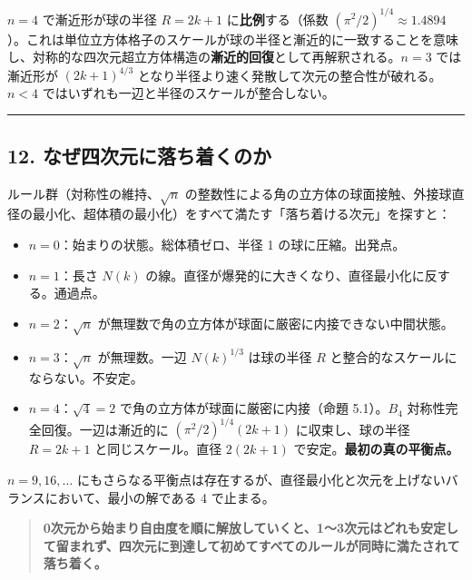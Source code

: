 \documentclass[a4paper,11pt]{ltjsarticle}
\theoremstyle{definition}
\providecommand{\tightlist}{\setlength{\itemsep}{0pt}\setlength{\parskip}{0pt}}
\begin{document}
\(n = 4\) で漸近形が球の半径 \(R = 2k+1\) に\textbf{比例}する（係数
\((\pi^2/2)^{1/4} \approx 1.4894\)）。これは単位立方体格子のスケールが球の半径と漸近的に一致することを意味し、対称的な四次元超立方体構造の\textbf{漸近的回復}として再解釈される。\(n = 3\)
では漸近形が \((2k+1)^{4/3}\)
となり半径より速く発散して次元の整合性が破れる。\(n < 4\)
ではいずれも一辺と半径のスケールが整合しない。

\begin{center}\rule{0.5\linewidth}{0.5pt}\end{center}

\subsection{12.
なぜ四次元に落ち着くのか}\label{ux306aux305cux56dbux6b21ux5143ux306bux843dux3061ux7740ux304fux306eux304b}

ルール群（対称性の維持、\(\sqrt{n}\)
の整数性による角の立方体の球面接触、外接球直径の最小化、超体積の最小化）をすべて満たす「落ち着ける次元」を探すと：

\begin{itemize}
\tightlist
\item
  \textbf{\(n = 0\)}：始まりの状態。総体積ゼロ、半径 1
  の球に圧縮。出発点。
\item
  \textbf{\(n = 1\)}：長さ \(N(k)\)
  の線。直径が爆発的に大きくなり、直径最小化に反する。通過点。
\item
  \textbf{\(n = 2\)}：\(\sqrt{n}\)
  が無理数で角の立方体が球面に厳密に内接できない中間状態。
\item
  \textbf{\(n = 3\)}：\(\sqrt{n}\) が無理数。一辺 \(N(k)^{1/3}\)
  は球の半径 \(R\) と整合的なスケールにならない。不安定。
\item
  \textbf{\(n = 4\)}：\(\sqrt{4} = 2\)
  で角の立方体が球面に厳密に内接（命題 5.1）。\(B_4\)
  対称性完全回復。一辺は漸近的に \((\pi^2/2)^{1/4}(2k+1)\)
  に収束し、球の半径 \(R = 2k+1\) と同じスケール。直径 \(2(2k+1)\)
  で安定。\textbf{最初の真の平衡点。}
\end{itemize}

\(n = 9, 16, \ldots\)
にもさらなる平衡点は存在するが、直径最小化と次元を上げないバランスにおいて、最小の解である
4 で止まる。

\begin{quote}
\textbf{0次元から始まり自由度を順に解放していくと、1〜3次元はどれも安定して留まれず、四次元に到達して初めてすべてのルールが同時に満たされて落ち着く。}
\end{quote}
\end{document}
